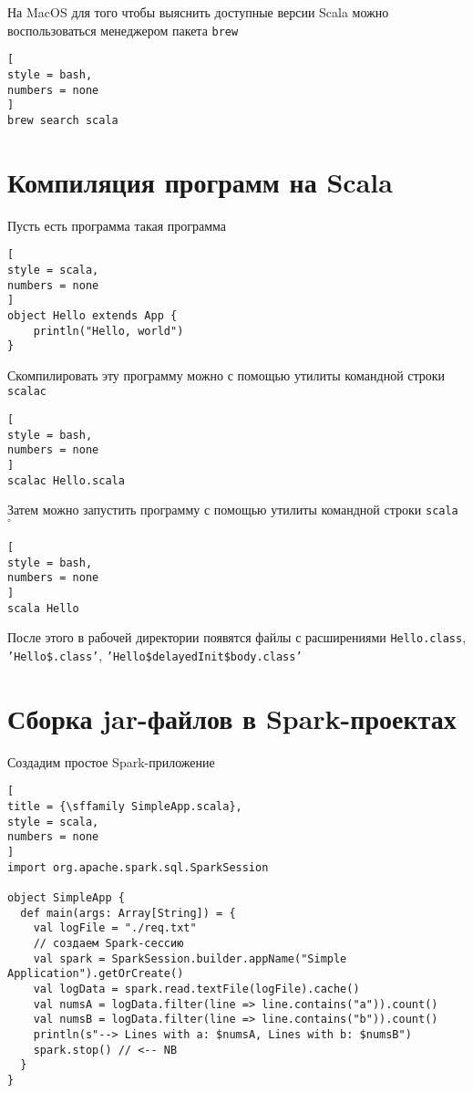 \documentclass[%
	11pt,
	a4paper,
	utf8,
		]{article}
\begin{document}
На MacOS для того чтобы выяснить доступные версии Scala можно воспользоваться менеджером пакета \texttt{brew}
\begin{lstlisting}[
style = bash,
numbers = none	
]
brew search scala
\end{lstlisting}


\section{Компиляция программ на Scala}

Пусть есть программа такая программа
\begin{lstlisting}[
style = scala,
numbers = none	
]
object Hello extends App {
	println("Hello, world")
}
\end{lstlisting}

Скомпилировать эту программу можно с помощью утилиты командной строки \texttt{scalac}
\begin{lstlisting}[
style = bash,
numbers = none	
]
scalac Hello.scala
\end{lstlisting}

Затем можно запустить программу с помощью утилиты командной строки \texttt{scala} $ {}^{\circ} $
\begin{lstlisting}[
style = bash,
numbers = none	
]
scala Hello
\end{lstlisting}

После этого в рабочей директории появятся файлы с расширениями \texttt{Hello.class}, \texttt{'Hello\$.class'}, \texttt{'Hello\$delayedInit\$body.class'}

\section{Сборка jar-файлов в Spark-проектах}

Создадим простое Spark-приложение 
\begin{lstlisting}[
title = {\sffamily SimpleApp.scala},
style = scala,
numbers = none	
]
import org.apache.spark.sql.SparkSession

object SimpleApp {
  def main(args: Array[String]) = {
    val logFile = "./req.txt"
    // создаем Spark-сессию
    val spark = SparkSession.builder.appName("Simple Application").getOrCreate()
    val logData = spark.read.textFile(logFile).cache()
    val numsA = logData.filter(line => line.contains("a")).count()
    val numsB = logData.filter(line => line.contains("b")).count()
    println(s"--> Lines with a: $numsA, Lines with b: $numsB")
    spark.stop() // <-- NB
  }
}
\end{lstlisting}
\end{document}
